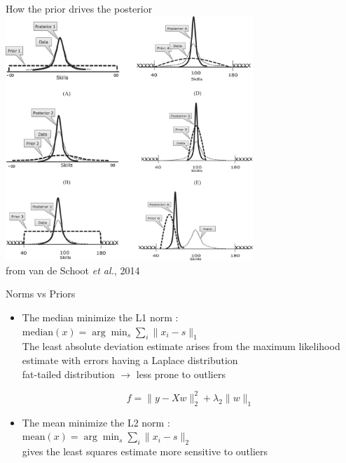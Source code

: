 \documentclass[10pt,xcolor=x11names,compress, show notes]{beamer}%
\begin{document}
\begin{frame}{How the prior drives the posterior}
	\centering
	\includegraphics[width=0.7\textwidth]{priors.png}\\
	\scriptsize from van de Schoot \textit{et al.}, 2014
\end{frame}

\begin{frame}{Norms vs Priors}
\begin{itemize}
        \item The median minimize the L1 norm : \\
        $\text{median}(x) = \arg\min_s \sum_i \|x_i - s\|_1$\\
        The least absolute deviation estimate arises from the maximum likelihood estimate with errors having a Laplace distribution\\
        fat-tailed distribution $\rightarrow$ less prone to outliers
        
        $$f=  \| y - Xw \|^2_2 + \lambda_2 \| w \|_1$$
        
        \item The mean minimize the L2 norm : \\
        $\text{mean}(x) = \arg\min_s \sum_i \|x_i - s\|_2$\\
        gives the least squares estimate
        more sensitive to outliers
        
\end{itemize}

\end{frame}
\end{document}

